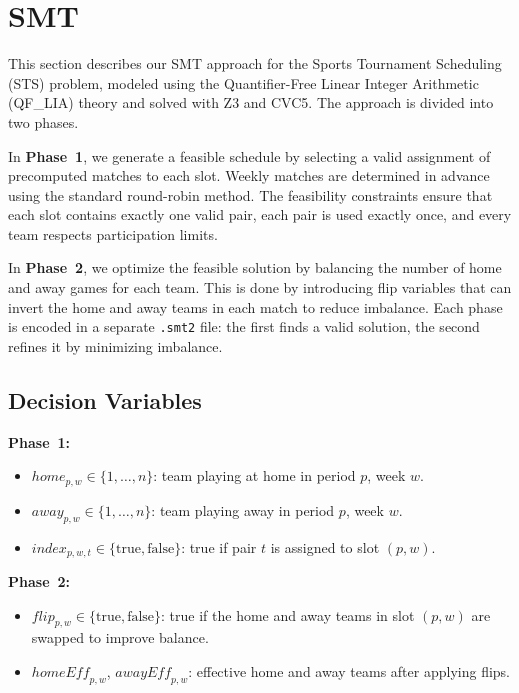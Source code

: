 \section{SMT}
This section describes our SMT approach for the Sports Tournament Scheduling (STS) problem, modeled using the Quantifier-Free Linear Integer Arithmetic (QF\_LIA) theory and solved with Z3 and CVC5.
The approach is divided into two phases.

In \textbf{Phase~1}, we generate a feasible schedule by selecting a valid assignment of precomputed matches to each slot. Weekly matches are determined in advance using the standard round-robin method. The feasibility constraints ensure that each slot contains exactly one valid pair, each pair is used exactly once, and every team respects participation limits.

In \textbf{Phase~2}, we optimize the feasible solution by balancing the number of home and away games for each team. This is done by introducing flip variables that can invert the home and away teams in each match to reduce imbalance. Each phase is encoded in a separate \texttt{.smt2} file: the first finds a valid solution, the second refines it by minimizing imbalance.

\subsection{Decision Variables}

\textbf{Phase~1:}
\begin{itemize}
    \item $\mathit{home}_{p,w} \in \{1,\dots,n\}$: team playing at home in period $p$, week $w$.
    \item $\mathit{away}_{p,w} \in \{1,\dots,n\}$: team playing away in period $p$, week $w$.
    \item $\mathit{index}_{p,w,t} \in \{ \text{true}, \text{false} \}$: true if pair $t$ is assigned to slot $(p,w)$.
\end{itemize}

\textbf{Phase~2:}
\begin{itemize}
    \item $\mathit{flip}_{p,w} \in \{ \text{true}, \text{false} \}$: true if the home and away teams in slot $(p,w)$ are swapped to improve balance.
    \item $\mathit{homeEff}_{p,w}$, $\mathit{awayEff}_{p,w}$: effective home and away teams after applying flips.
\end{itemize}

